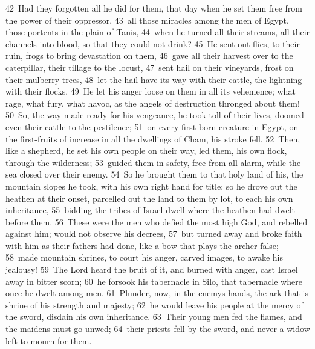 \documentclass[10pt]{book} %
\begin{document}
\textcolor{benred8}{42}~Had they forgotten all he did for them, that day when he set them free from the power of their oppressor, \textcolor{benred8}{43}~all those miracles among the men of Egypt, those portents in the plain of Tanis, \textcolor{benred8}{44}~when he turned all their streams, all their channels into blood, so that they could not drink? \textcolor{benred8}{45}~He sent out flies, to their ruin, frogs to bring devastation on them, \textcolor{benred8}{46}~gave all their harvest over to the caterpillar, their tillage to the locust, \textcolor{benred8}{47}~sent hail on their vineyards, frost on their mulberry-trees, \textcolor{benred8}{48}~let the hail have its way with their cattle, the lightning with their flocks. \textcolor{benred8}{49}~He let his anger loose on them in all its vehemence; what rage, what fury, what havoc, as the angels of destruction thronged about them! \textcolor{benred8}{50}~So, the way made ready for his vengeance, he took toll of their lives, doomed even their cattle to the pestilence; \textcolor{benred8}{51}~on every first-born creature in Egypt, on the first-fruits of increase in all the dwellings of Cham, his stroke fell. \textcolor{benred8}{52}~Then, like a shepherd, he set his own people on their way, led them, his own flock, through the wilderness; \textcolor{benred8}{53}~guided them in safety, free from all alarm, while the sea closed over their enemy. \textcolor{benred8}{54}~So he brought them to that holy land of his, the mountain slopes he took, with his own right hand for title; so he drove out the heathen at their onset, parcelled out the land to them by lot, to each his own inheritance, \textcolor{benred8}{55}~bidding the tribes of Israel dwell where the heathen had dwelt before them.
\textcolor{benred8}{56}~These were the men who defied the most high God, and rebelled against him; would not observe his decrees, \textcolor{benred8}{57}~but turned away and broke faith with him as their fathers had done, like a bow that plays the archer false; \textcolor{benred8}{58}~made mountain shrines, to court his anger, carved images, to awake his jealousy! \textcolor{benred8}{59}~The Lord heard the bruit of it, and burned with anger, cast Israel away in bitter scorn; \textcolor{benred8}{60}~he forsook his tabernacle in Silo, that tabernacle where once he dwelt among men. \textcolor{benred8}{61}~Plunder, now, in the enemy\textquotesingle s hands, the ark that is shrine of his strength and majesty; \textcolor{benred8}{62}~he would leave his people at the mercy of the sword, disdain his own inheritance. \textcolor{benred8}{63}~Their young men fed the flames, and the maidens must go unwed; \textcolor{benred8}{64}~their priests fell by the sword, and never a widow left to mourn for them.
\end{document}
